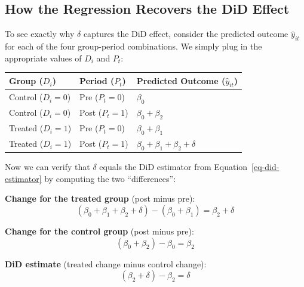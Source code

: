 \documentclass[
  letterpaper,
  DIV=11,
  numbers=noendperiod]{scrreprt}
\newcounter{none} %
\begin{document}
\subsection{How the Regression Recovers the DiD
Effect}\label{how-the-regression-recovers-the-did-effect}

To see exactly why \(\delta\) captures the DiD effect, consider the
predicted outcome \(\hat{y}_{it}\) for each of the four group-period
combinations. We simply plug in the appropriate values of \(D_i\) and
\(P_t\):

{\def\LTcaptype{none} %
\begin{longtable}[]{@{}
  >{\centering\arraybackslash}p{}
  >{\centering\arraybackslash}p{}
  >{\centering\arraybackslash}p{}@{}}
\toprule\noalign{}
\begin{minipage}[b]{\linewidth}\centering
Group (\(D_i\))
\end{minipage} & \begin{minipage}[b]{\linewidth}\centering
Period (\(P_t\))
\end{minipage} & \begin{minipage}[b]{\linewidth}\centering
Predicted Outcome (\(\hat{y}_{it}\))
\end{minipage} \\
\midrule\noalign{}
\endhead
\bottomrule\noalign{}
\endlastfoot
Control (\(D_i = 0\)) & Pre (\(P_t = 0\)) & \(\beta_0\) \\
Control (\(D_i = 0\)) & Post (\(P_t = 1\)) & \(\beta_0 + \beta_2\) \\
Treated (\(D_i = 1\)) & Pre (\(P_t = 0\)) & \(\beta_0 + \beta_1\) \\
Treated (\(D_i = 1\)) & Post (\(P_t = 1\)) &
\(\beta_0 + \beta_1 + \beta_2 + \delta\) \\
\end{longtable}
}

Now we can verify that \(\delta\) equals the DiD estimator from
Equation~\ref{eq-did-estimator} by computing the two ``differences'':

\textbf{Change for the treated group} (post minus pre): \[
(\beta_0 + \beta_1 + \beta_2 + \delta) - (\beta_0 + \beta_1) = \beta_2 + \delta
\]

\textbf{Change for the control group} (post minus pre): \[
(\beta_0 + \beta_2) - \beta_0 = \beta_2
\]

\textbf{DiD estimate} (treated change minus control change): \[
(\beta_2 + \delta) - \beta_2 = \delta
\]
\end{document}
